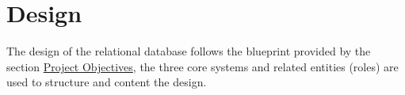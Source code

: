 \documentclass[12pt]{report}
\begin{document}
\section{Design} \label{data-layer.design}
The design of the relational database follows the blueprint provided by the section \hyperref[overview.project-objectives]{Project Objectives},
the three core systems and related entities (roles) are used to structure and content the design.







\end{document}
